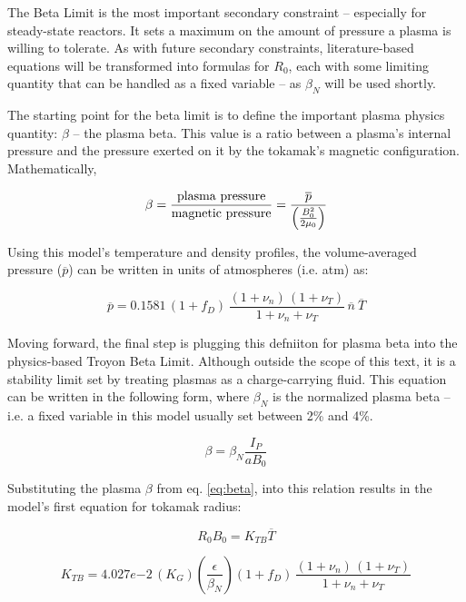 The Beta Limit is the most important secondary constraint -- especially for steady-state reactors. It sets a maximum on the amount of pressure a plasma is willing to tolerate. As with future secondary constraints, literature-based equations will be transformed into formulas for $R_0$, each with some limiting quantity that can be handled as a fixed variable -- as $\beta_N$ will be used shortly.

The starting point for the beta limit is to define the important plasma physics quantity: $\beta$ -- the plasma beta. This value is a ratio between a plasma's internal pressure and the pressure exerted on it by the tokamak's magnetic configuration. Mathematically,

\begin{equation}
	\label{eq:beta}
	\beta = \frac{\textnormal{plasma pressure}}{\textnormal{magnetic pressure}} = \frac{ \overline p }{ \left( \frac{B_0^2}{2 \mu_0} \right) }
\end{equation}

Using this model's temperature and density profiles, the volume-averaged pressure ($\overline p$) can be written in units of atmospheres (i.e. atm) as:

\begin{equation}
  \overline{p} = 0.1581 \, ( 1 + f_D ) \, \frac{ (1 + \nu_n) \, (1 + \nu_T) }{1 + \nu_n + \nu_T } \, \overline{n} \ \overline{T}
\end{equation}

Moving forward, the final step is plugging this defniiton for plasma beta into the physics-based Troyon Beta Limit. Although outside the scope of this text, it is a stability limit set by treating plasmas as a charge-carrying fluid. This equation can be written in the following form, where $\beta_N$ is the normalized plasma beta -- i.e. a fixed variable in this model usually set between 2\% and 4\%.

\begin{equation}
	\beta = \beta_N \frac{ I_P }{ a B_0 }
\end{equation}

Substituting the plasma $\beta$ from eq. \ref{eq:beta}, into this relation results in the model's first equation for tokamak radius:

\begin{equation}
  R_0 B_0 = K_{TB} \overline{T} 
\end{equation}

\begin{equation}
  K_{TB} = 4.027e{-2} \, ( K_G ) \left( \frac{\epsilon}{\beta_N} \right)  ( 1 + f_D ) \, \frac{ (1 + \nu_n) \, (1 + \nu_T) }{1 + \nu_n + \nu_T }
\end{equation}

